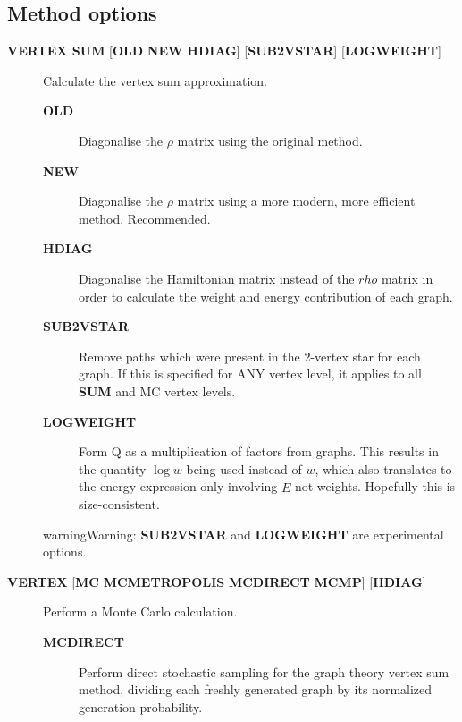 \documentclass[openany,a4paper,10pt,english]{manual}
\begin{document}
\subsection{Method options}
\begin{description}
\item[\textbf{VERTEX SUM} {[}\textbf{OLD} \textbf{NEW} \textbf{HDIAG}{]} {[}\textbf{SUB2VSTAR}{]} {[}\textbf{LOGWEIGHT}{]}] \leavevmode
Calculate the vertex sum approximation.
\begin{description}
\item[\textbf{OLD}] \leavevmode
Diagonalise the $\rho$ matrix using the original method.

\item[\textbf{NEW}] \leavevmode
Diagonalise the $\rho$ matrix using a more modern, more
efficient method.  Recommended.

\item[\textbf{HDIAG}] \leavevmode
Diagonalise the Hamiltonian matrix instead of the $rho$ matrix
in order to calculate the weight and energy contribution of each graph.

\item[\textbf{SUB2VSTAR}] \leavevmode
Remove paths which were present in the 2-vertex
star for each graph.  If this is specified for ANY vertex level,
it applies to all \textbf{SUM} and MC vertex levels.

\item[\textbf{LOGWEIGHT}] \leavevmode
Form Q as a multiplication of factors from graphs.  This results
in the quantity $\operatorname{log} w$ being used instead
of $w$, which also translates to the energy expression
only involving $\tilde{E}$ not weights.  Hopefully this
is size-consistent.

\end{description}

\begin{notice}{warning}{Warning:}
\textbf{SUB2VSTAR} and \textbf{LOGWEIGHT} are experimental options.
\end{notice}

\item[\textbf{VERTEX} {[}\textbf{MC} \textbf{MCMETROPOLIS} \textbf{MCDIRECT} \textbf{MCMP}{]} {[}\textbf{HDIAG}{]}] \leavevmode
Perform a Monte Carlo calculation.
\begin{description}
\item[\textbf{MCDIRECT}] \leavevmode
Perform direct stochastic sampling for the graph theory vertex sum
method, dividing each freshly generated graph by its normalized
generation probability.


\end{description}
\end{description}
\end{document}
